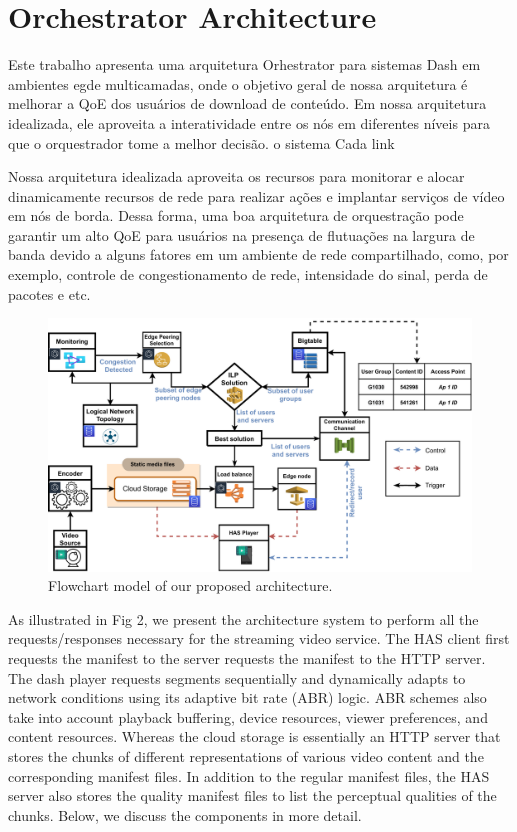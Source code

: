 \section{Orchestrator Architecture}
\label{sec:mechanism}

Este trabalho apresenta uma arquitetura Orhestrator para sistemas Dash em ambientes egde multicamadas, onde o objetivo geral de nossa arquitetura é melhorar a QoE dos usuários de download de conteúdo. Em nossa arquitetura idealizada, ele aproveita a interatividade entre os nós em diferentes níveis para que o orquestrador tome a melhor decisão. o sistema Cada link

Nossa arquitetura idealizada aproveita os recursos para monitorar e alocar dinamicamente recursos de rede para realizar ações e implantar serviços de vídeo em nós de borda. Dessa forma, uma boa arquitetura de orquestração pode garantir um alto QoE para usuários na presença de flutuações na largura de banda devido a alguns fatores em um ambiente de rede compartilhado, como, por exemplo, controle de congestionamento de rede, intensidade do sinal, perda de pacotes e etc.

\begin{figure}
  \includegraphics[width=\linewidth]{images/flow-model-infrastructure.pdf}
  \caption{Flowchart model of our proposed architecture.}
\end{figure}

As illustrated in Fig 2, we present the architecture system to perform all the requests/responses necessary for the streaming video service. The HAS client first requests the manifest to the server requests the manifest to the HTTP server. The dash player requests segments sequentially and dynamically adapts to network conditions using its adaptive bit rate (ABR) logic. ABR schemes also take into account playback buffering, device resources, viewer preferences, and content resources. Whereas the cloud storage is essentially an HTTP server that stores the chunks of different representations of various video content and the corresponding manifest files. In addition to the regular manifest files, the HAS server also stores the quality manifest files to list the perceptual qualities of the chunks. Below, we discuss the components in more detail.

